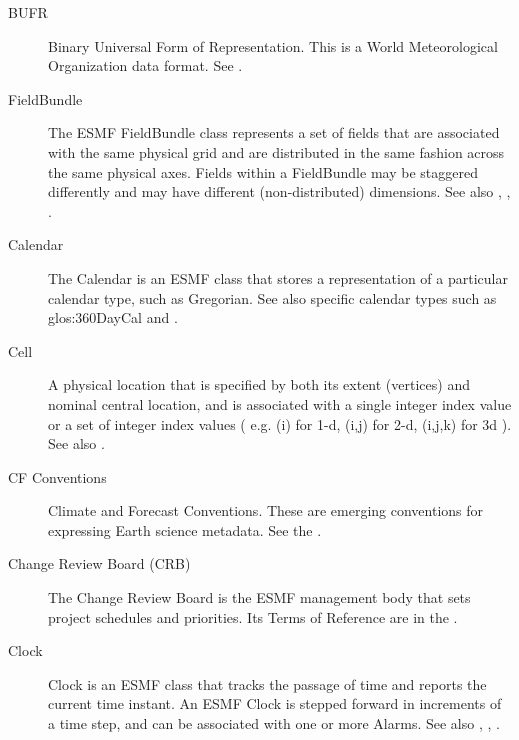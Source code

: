 \begin{description}
\label{glos:BUFR}
\item[BUFR]
  Binary Universal Form of Representation.  This is a World Meteorological Organization
data format.  See .

\label{glos:FieldBundle}
\item[FieldBundle] The ESMF FieldBundle class represents a set of fields that 
  are associated with the same physical grid and are distributed in 
  the same fashion across the same physical axes.  Fields within a
  FieldBundle may be staggered differently and may have different (non-distributed)
  dimensions.  See also , ,
  . 

\label{glos:Calendar}
\item[Calendar] The Calendar is an ESMF class that 
  stores a representation of a particular calendar type, such as Gregorian.
  See also specific calendar types such as 
  {glos:360DayCal} and .

\label{glos:Cell}
\item[Cell] A physical location that is specified by both 
  its extent (vertices) and nominal central location, and is associated with 
  a single integer index value or a set of integer index values ( e.g.
  (i) for 1-d, (i,j) for 2-d, (i,j,k) for 3d ). 
  See also .

\label{glos:CF}
\item[CF Conventions]
Climate and Forecast Conventions.  These are emerging conventions for expressing 
Earth science metadata.  See the .

\label{glos:CRB}
\item[Change Review Board (CRB)] The Change Review Board is the ESMF management
body that sets project schedules and priorities.  Its Terms of Reference
are in the .

\label{glos:Clock}
\item[Clock] Clock is an ESMF class that tracks the passage of time and 
  reports the current time instant.  An ESMF Clock 
  is stepped forward in increments of a time step, and can be associated
  with one or more Alarms.
  See also , , .


\end{description}

